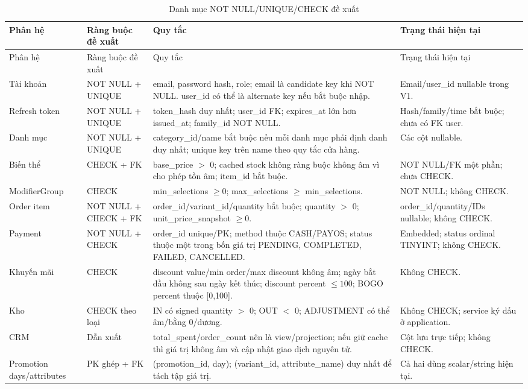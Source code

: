 \documentclass[12pt,a4paper,oneside]{report}
\begin{document}
\small\begin{longtable}{@{}D{2.3cm}D{3.1cm}D{6.1cm}D{3.4cm}@{}}
\caption{Danh mục NOT NULL/UNIQUE/CHECK đề xuất}\\
\toprule Phân hệ & Ràng buộc đề xuất & Quy tắc & Trạng thái hiện tại\\\midrule
\endfirsthead
\toprule Phân hệ & Ràng buộc đề xuất & Quy tắc & Trạng thái hiện tại\\\midrule
\endhead
\bottomrule\endfoot
Tài khoản & NOT NULL + UNIQUE & email, password hash, role; email là candidate key khi NOT NULL. user\_\allowbreak id có thể là alternate key nếu bắt buộc nhập. & Email/user\_\allowbreak id nullable trong V1.\\
Refresh token & NOT NULL + UNIQUE & token\_\allowbreak hash duy nhất; user\_\allowbreak id FK; expires\_\allowbreak at lớn hơn issued\_\allowbreak at; family\_\allowbreak id NOT NULL. & Hash/family/time bắt buộc; chưa có FK user.\\
Danh mục & NOT NULL + UNIQUE & category\_\allowbreak id/name bắt buộc nếu mỗi danh mục phải định danh duy nhất; unique key trên name theo quy tắc cửa hàng. & Các cột nullable.\\
Biến thể & CHECK + FK & base\_\allowbreak price $>$ 0; cached stock không ràng buộc không âm vì cho phép tồn âm; item\_\allowbreak id bắt buộc. & NOT NULL/FK một phần; chưa CHECK.\\
ModifierGroup & CHECK & min\_\allowbreak selections $\geq 0$; max\_\allowbreak selections $\geq$ min\_\allowbreak selections. & NOT NULL; không CHECK.\\
Order item & NOT NULL + CHECK + FK & order\_\allowbreak id/variant\_\allowbreak id/quantity bắt buộc; quantity $>$ 0; unit\_\allowbreak price\_\allowbreak snapshot $\geq 0$. & order\_\allowbreak id/quantity/IDs nullable; không CHECK.\\
Payment & NOT NULL + CHECK & order\_\allowbreak id unique/PK; method thuộc CASH/PAYOS; status thuộc một trong bốn giá trị PENDING, COMPLETED, FAILED, CANCELLED. & Embedded; status ordinal TINYINT; không CHECK.\\
Khuyến mãi & CHECK & discount value/min order/max discount không âm; ngày bắt đầu không sau ngày kết thúc; discount percent $\leq 100$; BOGO percent thuộc [0,100]. & Không CHECK.\\
Kho & CHECK theo loại & IN có signed quantity $>$ 0; OUT $<$ 0; ADJUSTMENT có thể âm/bằng 0/dương. & Không CHECK; service ký dấu ở application.\\
CRM & Dẫn xuất & total\_\allowbreak spent/order\_\allowbreak count nên là view/projection; nếu giữ cache thì giá trị không âm và cập nhật giao dịch nguyên tử. & Cột lưu trực tiếp; không CHECK.\\
Promotion days/attributes & PK ghép + FK & (promotion\_\allowbreak id, day); (variant\_\allowbreak id, attribute\_\allowbreak name) duy nhất để tách tập giá trị. & Cả hai dùng scalar/string hiện tại.\\
\end{longtable}\normalsize
\end{document}
